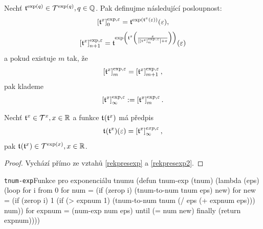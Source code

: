\begin{definition}
Nechť $\mathfrak{t}^{\mathrm{exp}(q)}\in\mathcal{T}^{\mathrm{exp}(q)},q\in\mathbb{Q}$. Pak definujme následující posloupnost:
\begin{equation}
\left[\mathfrak{t}^{x}\right]_0^{\mathrm{exp},\varepsilon}=\mathfrak{t}^{\mathrm{exp}(\mathfrak{t}^{x}(\varepsilon))}(\varepsilon),
\end{equation}
\begin{equation}
\left[ \mathfrak{t}^{x}\right]_{n+1}^{\mathrm{exp},\varepsilon}=\mathfrak{t}^{\mathrm{exp}\left(\mathfrak{t}^{x}\left(\frac{\varepsilon}{\left|\left[ \mathfrak{t}^{x}\right]_n^{\mathrm{exp},\varepsilon}\right|+\varepsilon}\right)\right)}(\varepsilon)
\end{equation}
a pokud existuje $m$ tak, že
\begin{equation}
\left[\mathfrak{t}^{x}\right]_m^{\mathrm{exp},\varepsilon} = \left[\mathfrak{t}^{x}\right]_{m+1}^{\mathrm{exp},\varepsilon},
\end{equation}
pak klademe
\begin{equation}
\left[\mathfrak{t}^{x} \right]_\infty^{\mathrm{exp},\varepsilon} := \left[\mathfrak{t}^{x}\right]_m^{\mathrm{exp},\varepsilon}.
\end{equation}
\end{definition}

\begin{consequence}\label{dusl:expotnumu}
Nechť $\mathfrak{t}^{x}\in\mathcal{T}^{x},x\in\mathbb{R}$ a funkce $\mathfrak{t}^{}(\mathfrak{t}^{x})$ má předpis
\begin{equation}
\mathfrak{t}^{}(\mathfrak{t}^{x})(\varepsilon)=\left[\mathfrak{t}^{x}\right]_\infty^{exp,\varepsilon},
\end{equation}
pak $\mathfrak{t}^{}(\mathfrak{t}^{x})\in\mathcal{T}^{\mathrm{exp}(x)},x\in\mathbb{R}$.
\begin{proof}
Vychází přímo ze vztahů \eqref{rekpresexp} a \eqref{rekpresexp2}.
\end{proof}
\end{consequence}

\begin{lispcode}{\texttt{tnum-exp}}{Funkce pro exponenciálu tnumu}
(\textcolor{funkcionalni}{defun} \textcolor{pojmenovan}{tnum-exp} (tnum)
  (\textcolor{funkcionalni}{lambda} (eps)
    (\textcolor{funkcionalni}{loop} \textcolor{obarvi}{for} i \textcolor{obarvi}{from} 0
          \textcolor{obarvi}{for} num = (\textcolor{funkcionalni}{if} (\textcolor{funkcionalni}{zerop} i) (\textcolor{moje}{tnum-to-num} tnum eps) new)
          \textcolor{obarvi}{for} new = (\textcolor{funkcionalni}{if} (\textcolor{funkcionalni}{zerop} i) 1
                      (\textcolor{funkcionalni}{if} (\textcolor{matematicke}{>} expnum 1)
                          (\textcolor{moje}{tnum-to-num} tnum (\textcolor{matematicke}{/} eps 
                                               (\textcolor{matematicke}{+} expnum eps)))
                        num))
          \textcolor{obarvi}{for} expnum = (\textcolor{moje}{num-exp} num eps)
          \textcolor{obarvi}{until} (\textcolor{matematicke}{=} num new) 
          \textcolor{obarvi}{finally} (\textcolor{funkcionalni}{return} expnum))))
\end{lispcode}

